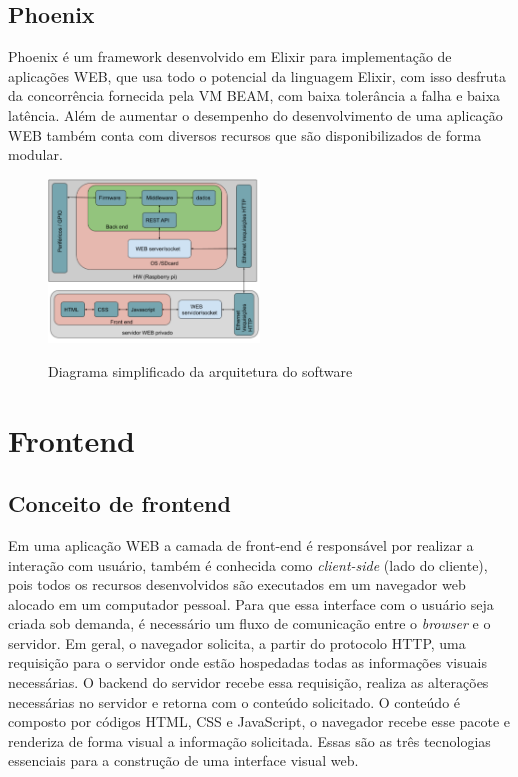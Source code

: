 \documentclass[../../layout.tex]{subfiles}
\begin{document}
\subsection{Phoenix}

\hspace*{3em}Phoenix é um framework desenvolvido em Elixir para implementação de aplicações WEB, que usa todo o potencial da linguagem Elixir, com isso desfruta da concorrência fornecida pela VM BEAM, com baixa tolerância a falha e baixa latência.  Além de aumentar o desempenho do desenvolvimento de uma aplicação WEB também conta com diversos recursos que são disponibilizados de forma modular\cite{phoenix}.

\begin{figure}[H]
\centering
\caption{Diagrama simplificado da arquitetura do software}
\includegraphics[width=0.5\textwidth]{assets/static/img/diagrama_tcc.jpg}
\label{fig:diagrama_sw}
\end{figure}

\section{Frontend}
\subsection{Conceito de frontend}

\hspace*{3em}Em uma aplicação WEB a camada de front-end é responsável por realizar a interação com usuário, também é conhecida como \emph{client-side} (lado do cliente), pois todos os recursos desenvolvidos são executados em um navegador web alocado em um computador pessoal. Para que essa interface com o usuário seja criada sob demanda, é necessário um fluxo de comunicação entre o \emph{browser} e o servidor. Em geral, o navegador solicita, a partir do protocolo HTTP, uma requisição para o servidor onde estão hospedadas todas as informações visuais necessárias. O backend do servidor recebe essa requisição, realiza as alterações necessárias no servidor e retorna com o conteúdo solicitado. O conteúdo é composto por códigos HTML, CSS e JavaScript, o navegador recebe esse pacote e renderiza de forma visual a informação solicitada. Essas são as três tecnologias essenciais para a construção de uma interface visual web.\cite{frontend}
\end{document}
